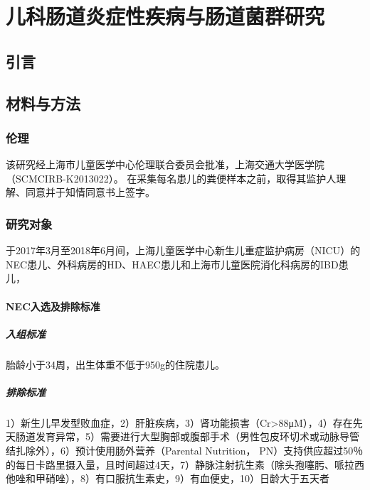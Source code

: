 
\chapter{儿科肠道炎症性疾病与肠道菌群研究}
\label{chap:compare}

\section{引言}
\section{材料与方法}
  \subsection{伦理}
  该研究经上海市儿童医学中心伦理联合委员会批准，上海交通大学医学院（SCMCIRB-K2013022）。 在采集每名患儿的粪便样本之前，取得其监护人理解、同意并于知情同意书上签字。
  \subsection{研究对象}
  于2017年3月至2018年6月间，上海儿童医学中心新生儿重症监护病房（NICU）的NEC患儿、外科病房的HD、HAEC患儿和上海市儿童医院消化科病房的IBD患儿，
    \subsubsection{NEC入选及排除标准}
      \paragraph{入组标准}
      胎龄小于34周，出生体重不低于950g的住院患儿。
      \paragraph{排除标准}
      1）新生儿早发型败血症，2）肝脏疾病，3）肾功能损害（Cr>88μM），4）存在先天肠道发育异常，5）需要进行大型胸部或腹部手术（男性包皮环切术或动脉导管结扎除外），6）预计使用肠外营养（Parental Nutrition， PN）支持供应超过50％的每日卡路里摄入量，且时间超过4天，7）静脉注射抗生素（除头孢噻肟、哌拉西他唑和甲硝唑），8）有口服抗生素史，9）有血便史，10）日龄大于五天者

